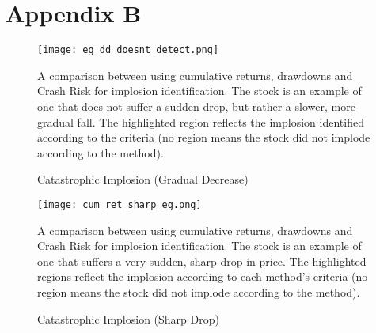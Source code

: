 \documentclass[a4paper]{report}
\begin{document}
\appendix
\renewcommand{\thefigure}{B\arabic{figure}} %
\chapter*{Appendix B} 


\begin{figure}[h]
  \centering
  \texttt{[image: eg\_dd\_doesnt\_detect.png]} %
  \caption{Catastrophic Implosion (Gradual Decrease)}
  \label{fig:cum_ret_dd_scr}
  \medskip %
  
  \parbox{\textwidth}{\footnotesize
  A comparison between using cumulative returns, drawdowns and Crash Risk for implosion identification. The stock 
  is an example of one that does not suffer a sudden drop, but rather a slower, more gradual fall. The highlighted region 
  reflects the implosion identified according to the criteria (no region means the stock did not implode according to the method).
  }
\end{figure}

\begin{figure}[h]
  \centering
  \texttt{[image: cum\_ret\_sharp\_eg.png]} %
  \caption{Catastrophic Implosion (Sharp Drop)}
  \label{fig:cum_ret_sharp}
  \medskip %
  
  \parbox{\textwidth}{\footnotesize
  A comparison between using cumulative returns, drawdowns and Crash Risk for implosion identification. The stock is an example of 
  one that suffers a very sudden, sharp drop in price. The highlighted regions reflect the implosion according to each method's criteria
  (no region means the stock did not implode according to the method).
  }
\end{figure}
\end{document}
